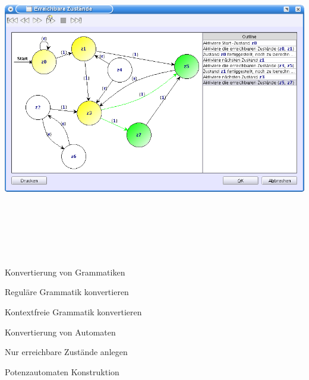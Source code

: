 {
  \begin{center}
    \includegraphics[height=14cm]{../images/reachable_states.png}
  \end{center}
}


{
    \begin{itemgroup}{}
	\item Konvertierung von Grammatiken
		\begin{itemgroup}{}
    	\item Reguläre Grammatik konvertieren
    	\item Kontextfreie Grammatik konvertieren
    	\end{itemgroup}
	\item Konvertierung von Automaten
		\begin{itemgroup}{}
    	\item Nur erreichbare Zustände anlegen
    	\item Potenzautomaten Konstruktion
    	\end{itemgroup}
	\end{itemgroup}
  
	\vfill{}
}


